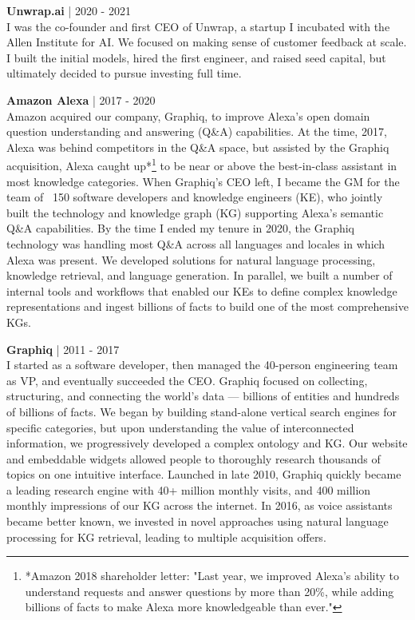 \documentclass[a4paper,10pt]{article}
\begin{document}
\vspace{5pt} %

\noindent
\textbf{Unwrap.ai} | 2020 - 2021 \\
I was the co-founder and first CEO of Unwrap, a startup I incubated with the Allen Institute for AI. We focused on making sense of customer feedback at scale. I built the initial models, hired the first engineer, and raised seed capital, but ultimately decided to pursue investing full time.

\vspace{5pt} %

\noindent
\textbf{Amazon Alexa} | 2017 - 2020 \\
Amazon acquired our company, Graphiq, to improve Alexa's open domain question understanding and answering (Q\&A) capabilities. At the time, 2017, Alexa was behind competitors in the Q\&A space, but assisted by the Graphiq acquisition, Alexa caught up*\footnote{*Amazon 2018 shareholder letter: "Last year, we improved Alexa’s ability to understand requests and answer questions by more than 20\%, while adding billions of facts to make Alexa more knowledgeable than ever."}  to be near or above the best-in-class assistant in most knowledge categories. When Graphiq's CEO left, I became the GM for the team of ~150 software developers and knowledge engineers (KE), who jointly built the technology and knowledge graph (KG) supporting Alexa's semantic Q\&A capabilities. By the time I ended my tenure in 2020, the Graphiq technology was handling most Q\&A across all languages and locales in which Alexa was present. We developed solutions for natural language processing, knowledge retrieval, and language generation. In parallel, we built a number of internal tools and workflows that enabled our KEs to define complex knowledge representations and ingest billions of facts to build one of the most comprehensive KGs.

\vspace{5pt} %

\noindent
\textbf{Graphiq} | 2011 - 2017 \\
I started as a software developer, then managed the 40-person engineering team as VP, and eventually succeeded the CEO. Graphiq focused on collecting, structuring, and connecting the world’s data — billions of entities and hundreds of billions of facts. We began by building stand-alone vertical search engines for specific categories, but upon understanding the value of interconnected information, we progressively developed a complex ontology and KG. Our website and embeddable widgets allowed people to thoroughly research thousands of topics on one intuitive interface. Launched in late 2010, Graphiq quickly became a leading research engine with 40+ million monthly visits, and 400 million monthly impressions of our KG across the internet. In 2016, as voice assistants became better known, we invested in novel approaches using natural language processing for KG retrieval, leading to multiple acquisition offers.
\end{document}
